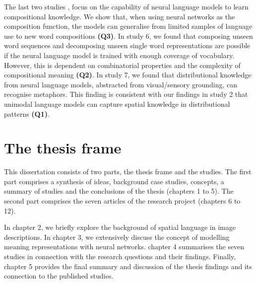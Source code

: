 The last two studies 
\cite{ghanimifard-dobnik-2017-learning,bizzoni-etal-2017-deep}, focus on the capability of neural language models to learn compositional knowledge. We show that, when using neural networks as the composition function, the models can generalise from limited samples of language use to new word compositions \textbf{(Q3)}. 
In study 6, we found that composing unseen word sequences and decomposing unseen single word representations are possible if the neural language model is trained with enough coverage of vocabulary.
However, this is dependent on combinatorial properties and the complexity of compositional meaning \textbf{(Q2)}.
In study 7, we found that distributional knowledge from neural language models, abstracted from visual/sensory grounding, can recognise metaphors.
This finding is consistent with our findings in study 2 \textemdash  that unimodal language models can capture spatial knowledge in distributional patterns \textbf{(Q1)}.

	
\section{The thesis frame}

This dissertation consists of two parts, the thesis frame and the studies. The first part comprises a synthesis of ideas, background case studies, concepts, a summary of studies and the conclusions of the thesis (chapters 1 to 5). The second part comprises the seven articles of the research project (chapters 6 to 12). 

In chapter 2, we briefly explore the background of spatial language in image descriptions. In chapter 3, we extensively discuss the concept of modelling meaning representations with neural networks. chapter 4 summarises the seven studies in connection with the research questions and their findings. Finally, chapter 5 provides the final summary and discussion of the thesis findings and its connection to the published studies.